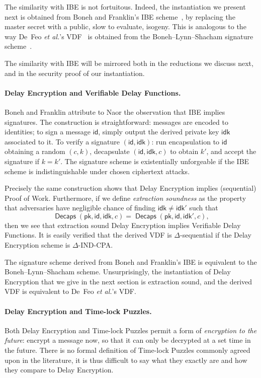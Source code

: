 \documentclass{llncs}
\DeclareMathOperator{\Decaps}{\mathsf{Decaps}}
\newcommand{\pk}{\mathsf{pk}}
\newcommand{\id}{\mathsf{id}}
\newcommand{\idk}{\mathsf{idk}}
\begin{document}
The similarity with IBE is not fortuitous. %
Indeed, the instantiation we present next is obtained from Boneh and
Franklin's IBE scheme~\cite{doi:10.1137/S0097539701398521}, by
replacing the master secret with a public, slow to evaluate, isogeny.
This is analogous to the way De~Feo \emph{et al.}'s
VDF~\cite{10.1007/978-3-030-34578-5_10} is obtained from the
Boneh--Lynn--Shacham signature scheme~\cite{boneh+lynn+shacham04}.

The similarity with IBE will be mirrored both in the reductions we
discuss next, and in the security proof of our instantiation.

\paragraph{Delay Encryption and Verifiable Delay Functions.}
Boneh and Franklin attribute to Naor the observation that IBE implies
signatures. %
The construction is straightforward: messages are encoded to
identities; to sign a message $\id$, simply output the derived private
key $\idk$ associated to it. %
To verify a signature $(\id,\idk)$: run encapsulation to $\id$
obtaining a random $(c,k)$, decapsulate $(\id,\idk,c)$ to obtain $k'$,
and accept the signature if $k=k'$. %
The signature scheme is existentially unforgeable if the IBE scheme is
indistinguishable under chosen ciphertext attacks.

Precisely the same construction shows that Delay Encryption implies
(sequential) Proof of Work. %
Furthermore, if we define \emph{extraction soundness} as the property
that adversaries have negligible chance of finding $\idk\ne\idk'$ such
that
\[\Decaps(\pk,\id,\idk,c) = \Decaps(\pk,\id,\idk',c),\]
then we see that extraction sound Delay Encryption implies Verifiable
Delay Functions. %
It is easily verified that the derived VDF is $\Delta$-sequential if
the Delay Encryption scheme is $\Delta$-IND-CPA.

The signature scheme derived from Boneh and Franklin's IBE is
equivalent to the Boneh--Lynn--Shacham scheme. %
Unsurprisingly, the instantiation of Delay Encryption that we give in
the next section is extraction sound, and the derived VDF is
equivalent to De~Feo \emph{et al.}'s VDF.

\paragraph{Delay Encryption and Time-lock Puzzles.}
Both Delay Encryption and Time-lock Puzzles permit a form of
\emph{encryption to the future}: encrypt a message now, so that it can
only be decrypted at a set time in the future. %
There is no formal definition of Time-lock Puzzles commonly agreed
upon in the literature, it is thus difficult to say what they exactly
are and how they compare to Delay Encryption.
\end{document}
